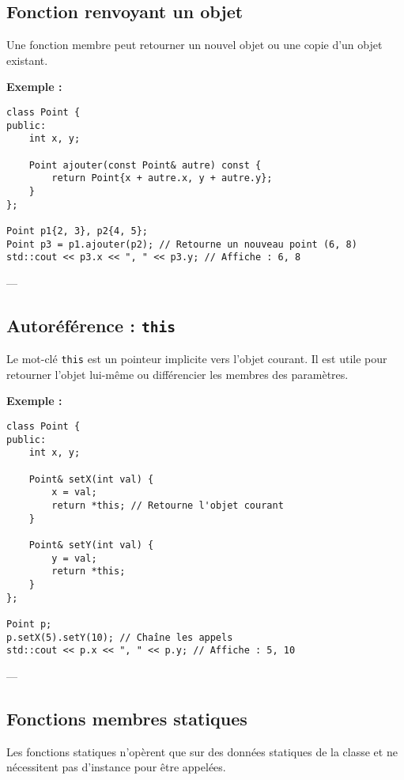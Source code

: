 \subsection{ Fonction renvoyant un objet}
Une fonction membre peut retourner un nouvel objet ou une copie d’un objet existant.

\textbf{Exemple :}
\begin{tcolorbox}[colframe=blue!50!black, colback=blue!5!white, title=Exemple d'Attributs et Méthodes Statistiques, float=htb]
\begin{verbatim}
class Point {
public:
    int x, y;

    Point ajouter(const Point& autre) const {
        return Point{x + autre.x, y + autre.y};
    }
};

Point p1{2, 3}, p2{4, 5};
Point p3 = p1.ajouter(p2); // Retourne un nouveau point (6, 8)
std::cout << p3.x << ", " << p3.y; // Affiche : 6, 8
\end{verbatim}
\end{tcolorbox}
---

\subsection{ Autoréférence : \texttt{this}}
Le mot-clé \texttt{this} est un pointeur implicite vers l'objet courant. Il est utile pour retourner l'objet lui-même ou différencier les membres des paramètres.

\textbf{Exemple :}
\begin{tcolorbox}[colframe=blue!50!black, colback=blue!5!white, title=Exemple d'Attributs et Méthodes Statistiques, float=htb]
\begin{verbatim}
class Point {
public:
    int x, y;

    Point& setX(int val) {
        x = val;
        return *this; // Retourne l'objet courant
    }

    Point& setY(int val) {
        y = val;
        return *this;
    }
};

Point p;
p.setX(5).setY(10); // Chaîne les appels
std::cout << p.x << ", " << p.y; // Affiche : 5, 10
\end{verbatim}
\end{tcolorbox}
---

\subsection{ Fonctions membres statiques}
Les fonctions statiques n'opèrent que sur des données statiques de la classe et ne nécessitent pas d'instance pour être appelées.

